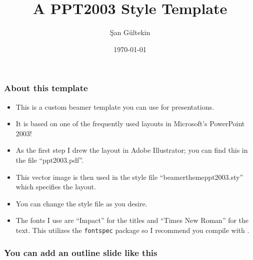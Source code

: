 \documentclass[dvipsnames]{beamer} %
\title{A PPT2003 Style Template}
\author[\c{S}an G\"{u}ltekin]{\c{S}an G\"{u}ltekin}
\institute{Columbia University}
\date[\today]{\today}
\begin{document}
\begin{frame}
\titlepage
\end{frame}



\begin{frame}
\frametitle{About this template}
\begin{itemize}
	\item This is a custom beamer template you can use for presentations.
	\item It is based on one of the frequently used layouts in Microsoft's PowerPoint 2003!
	\item As the first step I drew the layout in Adobe Illustrator; you can find this in the file ``ppt2003.pdf''.
	\item This vector image is then used in the style file ``beamerthemeppt2003.sty'' which specifies the layout.
	\item You can change the style file as you desire.
	\item The fonts I use are ``Impact'' for the titles and ``Times New Roman'' for the text. This utilizes the \texttt{fontspec} package so I recommend you compile with \XeLaTeX.
\end{itemize}
\end{frame}



\begin{frame}
\begin{center}
\frametitle{You can add an outline slide like this}
\noindent{} \\
\vspace{.1in}
\noindent{} \\
\vspace{.1in}
\noindent{}
\end{center}
\end{frame}
\end{document}
